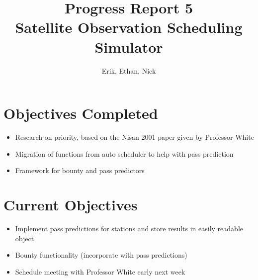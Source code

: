 \documentclass{article}
\title{Progress Report 5\\ Satellite Observation Scheduling Simulator}
\author{Erik, Ethan, Nick}
\begin{document}
\maketitle

\section{Objectives Completed}

\begin{itemize}
	\item Research on priority, based on the Nisan 2001 paper given by Professor White
	\item Migration of functions from auto scheduler to help with pass prediction
	\item Framework for bounty and pass predictors
\end{itemize}

\section{Current Objectives}

\begin{itemize}
  \item Implement pass predictions for stations and store results in easily readable object
  \item Bounty functionality (incorporate with pass predictions)
  \item Schedule meeting with Professor White early next week
\end{itemize}
\end{document}
